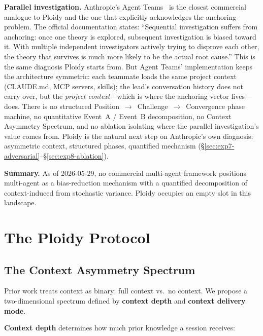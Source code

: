 \documentclass[11pt]{article}
\begin{document}
\textbf{Parallel investigation.} Anthropic's Agent
Teams~\citep{anthropic2026agentteams} is the closest commercial
analogue to Ploidy and the one that explicitly acknowledges the
anchoring problem. The official documentation states:
``Sequential investigation suffers from anchoring: once one
theory is explored, subsequent investigation is biased toward
it. With multiple independent investigators actively trying to
disprove each other, the theory that survives is much more
likely to be the actual root cause.'' This is the same
diagnosis Ploidy starts from. But Agent Teams' implementation
keeps the architecture symmetric: each teammate loads the same
project context (CLAUDE.md, MCP servers, skills); the
lead's conversation history does not carry over, but the
\emph{project context}---which is where the anchoring vector
lives---does. There is no structured Position~$\to$~Challenge~$\to$~Convergence
phase machine, no quantitative Event~A / Event~B
decomposition, no Context Asymmetry Spectrum, and no
ablation isolating where the parallel investigation's value
comes from. Ploidy is the natural next step on Anthropic's own
diagnosis: asymmetric context, structured phases, quantified
mechanism (\S\ref{sec:exp7-adversarial}--\S\ref{sec:exp8-ablation}).

\textbf{Summary.} As of 2026-05-29, no commercial multi-agent
framework positions multi-agent as a bias-reduction mechanism
with a quantified decomposition of context-induced from
stochastic variance. Ploidy occupies an empty slot in this
landscape.

\section{The Ploidy Protocol}
\label{sec:protocol}

\subsection{The Context Asymmetry Spectrum}
\label{sec:spectrum}

Prior work treats context as binary: full context vs.\ no context. We propose a two-dimensional spectrum defined by \textbf{context depth} and \textbf{context delivery mode}.

\textbf{Context depth} determines how much prior knowledge a session receives:
\end{document}

